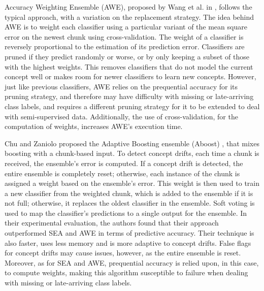 Accuracy Weighting Ensemble (AWE), proposed by Wang et al. in \cite{wang2003mining}, follows the typical approach, with a variation on the replacement strategy. The idea behind AWE is to weight each classifier using a particular variant of the mean square error on the newest chunk using cross-validation. The weight of a classifier is reversely proportional to the estimation of its prediction error. Classifiers are pruned if they predict randomly or worse, or by only keeping a subset of those with the highest weights. This removes classifiers that do not model the current concept well or makes room for newer classifiers to learn new concepts. However, just like previous classifiers, AWE relies on the prequential accuracy for its pruning strategy, and therefore may have difficulty with missing or late-arriving class labels, and requires a different pruning strategy for it to be extended to deal with semi-supervised data. Additionally, the use of cross-validation, for the computation of weights, increases AWE's execution time.

Chu and Zaniolo proposed the Adaptive Boosting ensemble (Aboost) \cite{chu2004fast}, that mixes boosting with a chunk-based input. To detect concept drifts, each time a chunk is received, the ensemble's error is computed. If a concept drift is detected, the entire ensemble is completely reset; otherwise, each instance of the chunk is assigned a weight based on the ensemble's error. This weight is then used to train a new classifier from the weighted chunk, which is added to the ensemble if it is not full; otherwise, it replaces the oldest classifier in the ensemble. Soft voting is used to map the classifier's predictions to a single output for the ensemble. In their experimental evaluation, the authors found that their approach outperformed SEA \cite{street2001streaming} and AWE \cite{wang2003mining} in terms of predictive accuracy. Their technique is also faster, uses less memory and is more adaptive to concept drifts. False flags for concept drifts may cause issues, however, as the entire ensemble is reset. Moreover, as for SEA and AWE, prequential accuracy is relied upon, in this case, to compute weights, making this algorithm susceptible to failure when dealing with missing or late-arriving class labels.

